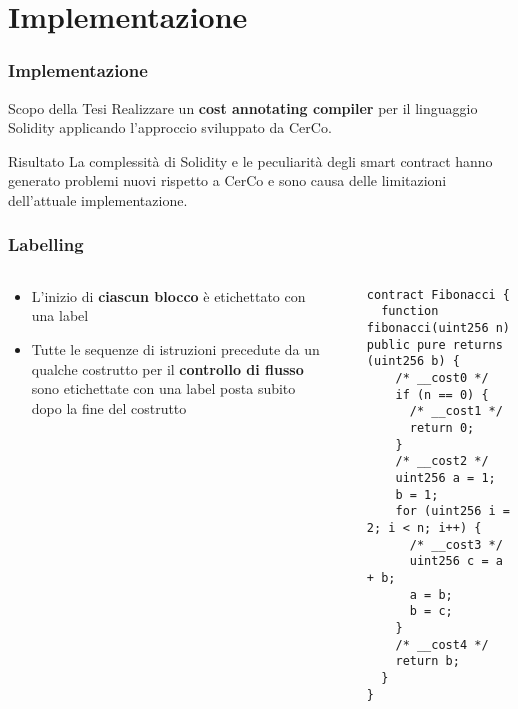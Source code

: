 \documentclass{beamer}
\begin{document}
\section{Implementazione}
\begin{frame}
    \frametitle{Implementazione}
    \begin{block}{Scopo della Tesi}
    Realizzare un \textbf{cost annotating compiler} per il linguaggio Solidity applicando l'approccio sviluppato da CerCo.
    \end{block}
    \begin{block}{Risultato}
    La complessit\`{a} di Solidity e le peculiarit\`{a} degli smart contract hanno generato problemi nuovi rispetto a CerCo e sono causa delle limitazioni dell'attuale implementazione.
    \end{block}
\end{frame}
\begin{frame}[fragile]
    \frametitle{Labelling}
    \begin{columns}
        \begin{column}{0.4\textwidth}
            \begin{itemize}
                \item L'inizio di \textbf{ciascun blocco} \`{e} etichettato con una label
                \item Tutte le sequenze di istruzioni precedute da un qualche costrutto per il \textbf{controllo di flusso} sono etichettate con una label posta subito dopo la fine del costrutto
            \end{itemize}
        \end{column}
        \begin{column}{0.05\textwidth}
        \end{column}
        \begin{column}{0.55\textwidth}
            \begin{adjustbox}{max height=3.5cm,keepaspectratio}
            \begin{lstlisting}[language=Solidity,frame=trlb,linewidth=9.8cm]
contract Fibonacci {
  function fibonacci(uint256 n) public pure returns (uint256 b) {
    /* __cost0 */
    if (n == 0) {
      /* __cost1 */
      return 0;
    }
    /* __cost2 */
    uint256 a = 1;
    b = 1;
    for (uint256 i = 2; i < n; i++) {
      /* __cost3 */
      uint256 c = a + b;
      a = b;
      b = c;
    }
    /* __cost4 */
    return b;
  }
}
            \end{lstlisting}
            \end{adjustbox}
            \end{column}
    \end{columns}
\end{frame}
\end{document}
